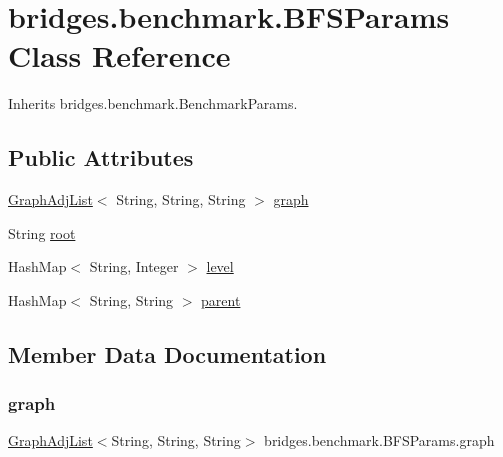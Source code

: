 \hypertarget{classbridges_1_1benchmark_1_1_b_f_s_params}{}\section{bridges.\+benchmark.\+B\+F\+S\+Params Class Reference}
\label{classbridges_1_1benchmark_1_1_b_f_s_params}


Inherits bridges.\+benchmark.\+Benchmark\+Params.

\subsection*{Public Attributes}
\begin{DoxyCompactItemize}
\item 
\mbox{\hyperlink{classbridges_1_1base_1_1_graph_adj_list}{Graph\+Adj\+List}}$<$ String, String, String $>$ \mbox{\hyperlink{classbridges_1_1benchmark_1_1_b_f_s_params_a02dcb89b57adca32f76baae05d443503}{graph}}
\item 
String \mbox{\hyperlink{classbridges_1_1benchmark_1_1_b_f_s_params_afb0381b52b0a8eddb60f420f119e4c99}{root}}
\item 
Hash\+Map$<$ String, Integer $>$ \mbox{\hyperlink{classbridges_1_1benchmark_1_1_b_f_s_params_afb4eff1d30d1f3a25d63d1bf8a4577ad}{level}}
\item 
Hash\+Map$<$ String, String $>$ \mbox{\hyperlink{classbridges_1_1benchmark_1_1_b_f_s_params_a2073895d415e83506c9b538b6d40e101}{parent}}
\end{DoxyCompactItemize}


\subsection{Member Data Documentation}
\mbox{\label{classbridges_1_1benchmark_1_1_b_f_s_params_a02dcb89b57adca32f76baae05d443503}} 
\subsubsection{\texorpdfstring{graph}{graph}}
{\footnotesize\ttfamily \mbox{\hyperlink{classbridges_1_1base_1_1_graph_adj_list}{Graph\+Adj\+List}}$<$String, String, String$>$ bridges.\+benchmark.\+B\+F\+S\+Params.\+graph}

